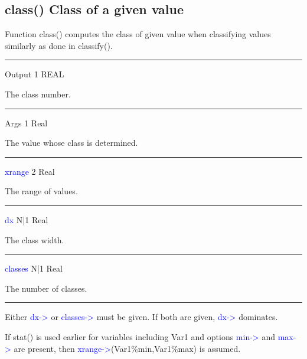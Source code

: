 \subsection{\textcolor{VioletRed}{class}() Class of a given value}
\label{class}
Function \textcolor{VioletRed}{class}() computes the class of given value when classifying values
similarly as done in \textcolor{VioletRed}{classify}().
\vspace{0.3cm}
\hrule
\vspace{0.3cm}
\noindent Output \tabto{3cm} 1 \tabto{5cm}  REAL \tabto{7cm}
\begin{changemargin}{3cm}{0cm}
\noindent The class number.
\end{changemargin}
\vspace{0.3cm}
\hrule
\vspace{0.3cm}
\noindent Args \tabto{3cm} 1 \tabto{5cm}  Real \tabto{7cm}
\begin{changemargin}{3cm}{0cm}
\noindent The value whose class is determined.
\end{changemargin}
\vspace{0.3cm}
\hrule
\vspace{0.3cm}
\noindent \textcolor{blue}{xrange} \tabto{3cm} 2 \tabto{5cm}  Real \tabto{7cm}
\begin{changemargin}{3cm}{0cm}
\noindent The range of values.
\end{changemargin}
\vspace{0.3cm}
\hrule
\vspace{0.3cm}
\noindent \textcolor{blue}{dx} \tabto{3cm} N|1 \tabto{5cm}  Real \tabto{7cm}
\begin{changemargin}{3cm}{0cm}
\noindent The class width.
\end{changemargin}
\vspace{0.3cm}
\hrule
\vspace{0.3cm}
\noindent \textcolor{blue}{classes} \tabto{3cm} N|1 \tabto{5cm}  Real \tabto{7cm}
\begin{changemargin}{3cm}{0cm}
\noindent The number of classes.
\end {changemargin}
\hrule
\vspace{0.2cm}
\begin{note}
Either \textcolor{blue}{dx->} or \textcolor{blue}{classes->} must be given. If both are given, \textcolor{blue}{dx->} dominates.
\end{note}
\begin{note}
If \textcolor{VioletRed}{stat}() is used earlier for variables including Var1 and
options \textcolor{blue}{min->} and \textcolor{blue}{max->} are present, then
\textcolor{blue}{xrange->}(Var1\%min,Var1\%max) is assumed.
\end{note}
